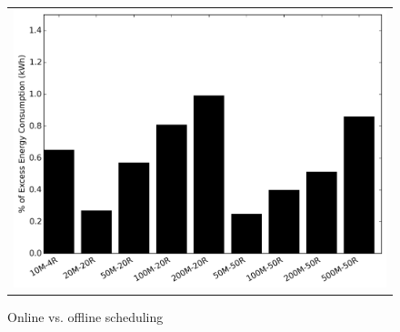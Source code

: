 \begin{figure}
\centering
\begin{tabular}{c}
\includegraphics[width=.8\linewidth]{figs/perc_excess_energy_oracle_def_compile_mtd.png}
\end{tabular}
\caption{Online vs. offline scheduling}
\label{fig:oracle_vs}
\end{figure}


